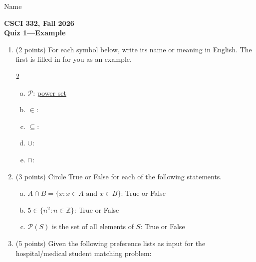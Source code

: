 \documentclass[11pt]{article}
\begin{document}
\noindent Name \underline{\hspace{12cm}}\\


\begin{center}
\Large\textbf{CSCI 332, Fall 2026}%
\\
\LARGE\textbf{Quiz 1---Example}%
\end{center}



\begin{enumerate}


\item (2 points) For each symbol below, write its name or meaning in English. The first is filled in for you as an example.

\begin{multicols}{2}
\begin{enumerate}[(a)]
    \item $\mathcal{P}$: \underline{power set}
    \item $\in$: \underline{\hspace{2in}}
    \item $\subseteq$: \underline{\hspace{2in}}
    \item $\cup$: \underline{\hspace{2in}}
    \item $\cap$: \underline{\hspace{2in}}
\end{enumerate}
\end{multicols}

\item (3 points) Circle True or False for each of the following statements.

\begin{enumerate}[(a)]
    \item $A \cap B = \{x : x \in A \text{ and } x \in B\}$: True or False
    \item $5 \in \{n^2 : n \in \mathbb{Z}\}$: True or False
    \item $\mathcal{P}(S)$ is the set of all elements of $S$: True or False
\end{enumerate}

\item (5 points) Given the following preference lists as input for the
hospital/medical student matching problem:


\end{enumerate}
\end{document}

